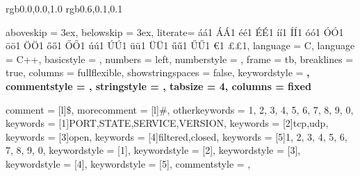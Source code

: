 


\definecolor{vsblue} {rgb}{0.0,0.0,1.0} %
\definecolor{vsred}  {rgb}{0.6,0.1,0.1} %


\lstset
{   
    aboveskip = 3ex,
    belowskip = 3ex,
    literate=
        {á}{{\'a}}1   {Á}{{\'A}}1   {é}{{\'e}}1   {É}{{\'E}}1
        {í}{{\'i}}1   {Í}{{\'I}}1   {ó}{{\'o}}1   {Ó}{{\'O}}1
        {ö}{{\"o}}1   {Ö}{{\"O}}1   {ő}{{\H{o}}}1 {Ő}{{\H{O}}}1
        {ú}{{\'u}}1   {Ú}{{\'U}}1   {ü}{{\"u}}1   {Ü}{{\"U}}1
        {ű}{{\H{u}}}1 {Ű}{{\H{U}}}1 {€}{{\EUR}}1  {£}{{\pounds}}1,
    language = C,
    language = C++,
    basicstyle = \small \ttfamily,
    numbers = left,
    numberstyle = \tiny,
    frame = tb,
    breaklines = true,
    columns = fullflexible,
    showstringspaces = false,
    keywordstyle = \color{vsblue} \bfseries,
    commentstyle = \color{vsgreen},
    stringstyle = \color{vsred},
    tabsize = 4,
    columns = fixed
}


{
    comment = [l]{\$},
    morecomment = [l]{\#},
    otherkeywords = {1, 2, 3, 4, 5, 6, 7, 8, 9, 0},
    keywords = [1]{PORT,STATE,SERVICE,VERSION},
    keywords = [2]{tcp,udp},
    keywords = [3]{open},
    keywords = [4]{filtered,closed},
    keywords = [5]{1, 2, 3, 4, 5, 6, 7, 8, 9, 0},
    keywordstyle = [1]\color{NavyBlue},
    keywordstyle = [2]\color{YellowOrange},
    keywordstyle = [3]\color{Green},
    keywordstyle = [4]\color{Red},
    keywordstyle = [5]\color{RedViolet},
    commentstyle = \color{Blue},
}
